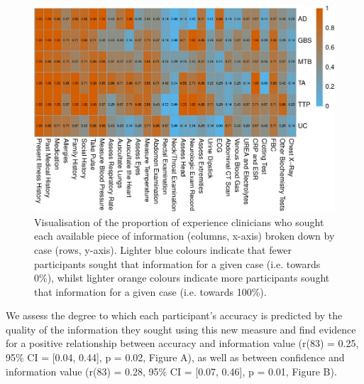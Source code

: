 \documentclass[a4paper, nobind]{templates/ociamthesis}
\begin{document}
\begin{figure}[H]

{\centering \includegraphics[width=1\linewidth]{_main_files/figure-latex/infoPropsExp-1} 

}

\caption[Online Study Appendix: Expert Information Seeking by Case (Heatmap)]{Visualisation of the proportion of experience clinicians who sought each available piece of information (columns, x-axis) broken down by case (rows, y-axis). Lighter blue colours indicate that fewer participants sought that information for a given case (i.e. towards 0\%), whilst lighter orange colours indicate more participants sought that information for a given case (i.e. towards 100\%).}\label{fig:infoPropsExp}
\end{figure}

We assess the degree to which each participant's accuracy is predicted by the quality of the information they sought using this new measure and find evidence for a positive relationship between accuracy and information value (r(83) = 0.25, 95\% CI = {[}0.04, 0.44{]}, p = 0.02, Figure A), as well as between confidence and information value (r(83) = 0.28, 95\% CI = {[}0.07, 0.46{]}, p = 0.01, Figure B).

\newpage
\end{document}
